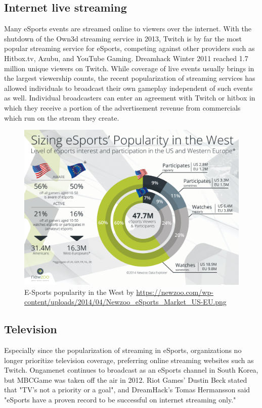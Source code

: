 	\subsection{Internet live streaming}
	Many eSports events are streamed online to viewers over the internet. With the shutdown of the Own3d streaming service in 2013, Twitch is by far the most popular streaming service for eSports, competing against other providers such as Hitbox.tv, Azubu, and YouTube Gaming. Dreamhack Winter 2011 reached 1.7 million unique viewers on Twitch. While coverage of live events usually brings in the largest viewership counts, the recent popularization of streaming services has allowed individuals to broadcast their own gameplay independent of such events as well. Individual broadcasters can enter an agreement with Twitch or hitbox in which they receive a portion of the advertisement revenue from commercials which run on the stream they create.
	
		\begin{figure}[!h]
			\begin{center}
				\includegraphics[width=0.8\linewidth]{images/newzoo_esport}
				\caption{E-Sports popularity in the West by \url{https://newzoo.com/wp-content/uploads/2014/04/Newzoo_eSports_Market_US-EU.png}}
			\end{center}
		\end{figure}
	\newpage
	
	\subsection{Television}
	Especially since the popularization of streaming in eSports, organizations no longer prioritize television coverage, preferring online streaming websites such as Twitch. Ongamenet continues to broadcast as an eSports channel in South Korea, but MBCGame was taken off the air in 2012. Riot Games' Dustin Beck stated that "TV's not a priority or a goal", and DreamHack's Tomas Hermansson said "eSports have a proven record to be successful on internet streaming only."
	

